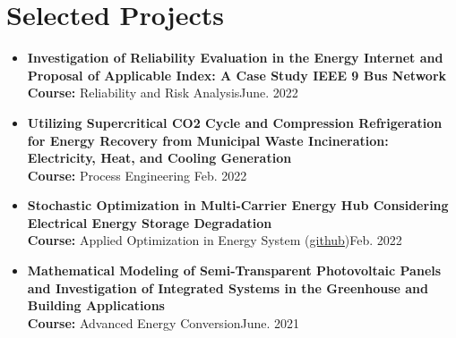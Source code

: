 \documentclass[letter,20pt]{article}
\begin{document}
\section{Selected Projects}	    
\vspace{5pt}

\begin{itemize}[noitemsep, topsep=6pt, after=\vspace{-0.5 mm},leftmargin = 0ex,rightmargin=1ex]
	\small \item[]  \textbf {Investigation of Reliability Evaluation in the Energy Internet and Proposal of Applicable Index: A Case Study IEEE 9 Bus Network}\vspace{3pt}\\
	{\footnotesize \textbf{Course:} Reliability and Risk Analysis}\vspace{10pt}\hfill {\footnotesize June. 2022}\\
	
	\small \item[]  \textbf {Utilizing Supercritical CO2 Cycle and Compression Refrigeration for Energy Recovery from Municipal 
Waste Incineration: Electricity, Heat, and Cooling Generation}\vspace{3pt}\\
	{\footnotesize \textbf{Course:} Process Engineering }\vspace{10pt}\hfill {\footnotesize Feb. 2022}\\
		
	\small \item[]  \textbf {Stochastic Optimization in Multi-Carrier Energy Hub Considering Electrical Energy Storage Degradation}\vspace{3pt}\\
	{\footnotesize \textbf{Course:} Applied Optimization in Energy System (\href{https://github.com/Mortezano1/Battery-degradation-in-Energy-Hub}{\underline{github}}\vspace{5pt})}\vspace{10pt}\hfill {\footnotesize Feb. 2022}\\

	\small \item[]  \textbf {Mathematical Modeling of Semi-Transparent Photovoltaic Panels and Investigation of Integrated Systems in the Greenhouse and Building Applications}\vspace{3pt}\\
	{\footnotesize \textbf{Course:} Advanced Energy Conversion}\vspace{10pt}\hfill {\footnotesize June. 2021}\\


\end{itemize}
\end{document}
